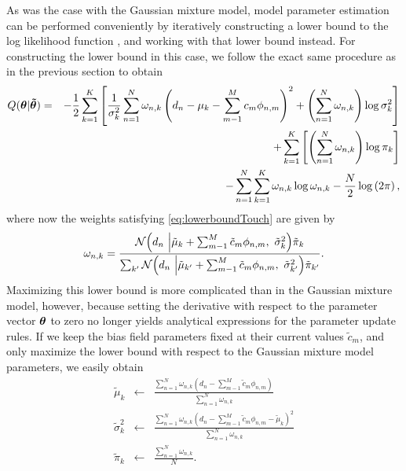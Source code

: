 \documentclass[10pt,twoside]{book}
\begin{document}
As was the case with the Gaussian mixture model, model parameter estimation can be performed conveniently by iteratively constructing a lower bound to the log likelihood function%
, and working with that lower bound instead. For constructing the lower bound in this case, we follow the exact same procedure as in the previous section to obtain
\begin{eqnarray}
  Q( {\mbox{\boldmath {${\theta}$}}} | {\mbox{\boldmath {${\tilde{\theta}}$}}}) & = & -\frac{1}{2} \sum_{k=1}^K \left[ \frac{1}{\sigma_k^2}\sum_{n=1}^N \omega_{n,k} \left( d_n - \mu_k - \sum_{m-1}^M c_m \phi_{n,m} \right)^2  
                                                                               + \left( \sum_{n=1}^N \omega_{n,k}  \right) \log \sigma_k^2 \right] 
                                                    \nonumber \\ 
                                              & &  + \sum_{k=1}^K \left[ \left( \sum_{n=1}^N \omega_{n,k} \right) \log \pi_k \right] \nonumber \\
                                              & &  - \sum_{n=1}^N\sum_{k=1}^K \omega_{n,k} \log \omega_{n,k} -\frac{N}{2}\log\left( 2 \pi \right),
  \label{eq:GEMLowerBound}
\end{eqnarray}
where now the weights satisfying \eqref{eq:lowerboundTouch} are given by
\begin{equation}
  \omega_{n,k} =  \frac{ \N \!\, \Big( d_n \,\, \Big| \tilde{\mu}_k + \sum_{m-1}^M \tilde{c}_m \phi_{n,m}, \,\, \tilde{\sigma}_k^2 \Big) \tilde{\pi}_k }%
                { \sum_{k'} \N \!\, \Big( d_n  \,\, \Big| \tilde{\mu}_{k'} + \sum_{m-1}^M \tilde{c}_m \phi_{n,m}, \,\, \tilde{\sigma}_{k'}^2 \Big) \tilde{\pi}_{k'}  }.
  \label{eq:GEMWeights}
\end{equation}
Maximizing this lower bound is more complicated than in the Gaussian mixture model, however, because setting the derivative with respect to the parameter vector 
${\mbox{\boldmath {${\theta}$}}}$ to zero no longer yields analytical expressions for the parameter update rules. 
If we keep the bias field parameters fixed at their current values $\tilde{c}_m$, and only maximize the lower bound with respect to the Gaussian mixture model parameters, we easily
obtain
\begin{eqnarray}
  \tilde{\mu}_k & \gets & \frac{\sum_{n=1}^N \omega_{n,k} \left( d_n - \sum_{m-1}^M \tilde{c}_m \phi_{n,m} \right) }{\sum_{n=1}^N \omega_{n,k}} \nonumber \\ 
  \tilde{\sigma}_k^2 & \gets & \frac{\sum_{n=1}^N \omega_{n,k} \left( d_n - \sum_{m-1}^M \tilde{c}_m \phi_{n,m}- \tilde{\mu}_k \right)^2 }{\sum_{n=1}^N \omega_{n,k}} \label{eq:GEMUpdateRulesGMMParameters}\\ 
  \tilde{\pi}_k & \gets & \frac{\sum_{n=1}^N \omega_{n,k} }{N}. \nonumber
\end{eqnarray}
\end{document}
